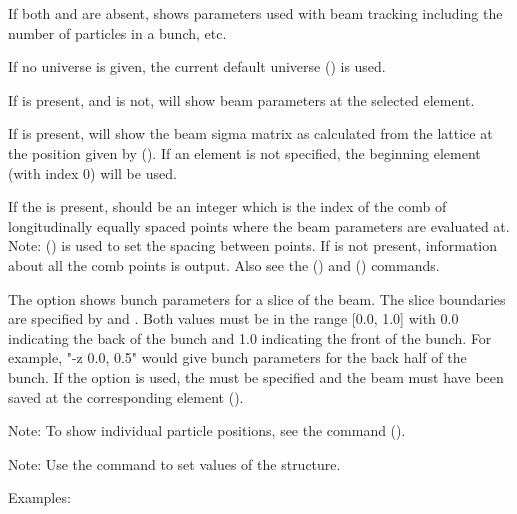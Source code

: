 {{{{{{{{{If both  and  are absent,  shows parameters
used with beam tracking including the number of particles in a bunch, etc.

If no universe is given, the current default universe () is used.

If  is present, and  is not,  will show beam
parameters at the selected element. 

If  is present,  will show the beam sigma matrix as calculated from the
lattice at the position given by  (). If an
element is not specified, the beginning element (with index 0) will be used.

If the  is present,  should be an integer which is the index of the comb
of longitudinally equally spaced points where the beam parameters are evaluated at.  Note:
 () is used to set the spacing between points.  If
 is not present, information about all the comb points is output. Also see the
 () and  ()
commands.

The  option shows bunch parameters for a slice of the beam. The slice boundaries
are specified by  and . Both values must be in the range [0.0, 1.0] with 0.0
indicating the back of the bunch and 1.0 indicating the front of the bunch. For example, "-z 0.0,
0.5" would give bunch parameters for the back half of the bunch. If the  option is used,
the  must be specified and the beam must have been saved at the corresponding
element ().

Note: To show individual particle positions, see the  command
().

Note: Use the  command to set values of the  structure.

Examples:


}}}}}}}}}
